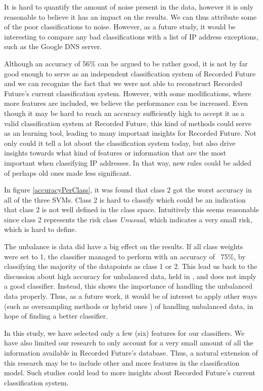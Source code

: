 It is hard to quantify the amount of noise present in the data, however it is only reasonable to believe it has an impact on the results. We can thus attribute some of the poor classifications to noise. However, as a future study, it would be interesting to compare any bad classifications with a list of IP address exceptions, such as the Google DNS server. 

Although an accuracy of 56\% can be argued to be rather good, it is not by far good enough to serve as an independent classification system of Recorded Future and we can recognize the fact that we were not able to reconstruct Recorded Future's current classification system. However, with some modifications, where more features are included, we believe the performance can be increased. Even though it may be hard to reach an accuracy sufficiently high to accept it as a valid classification system at Recorded Future, this kind of methods could serve as an learning tool, leading to many important insights for Recorded Future. Not only could it tell a lot about the classification system today, but also drive insights towards what kind of features or information that are the most important when classifying IP addresses. In that way, new rules could be added of perhaps old ones made less significant. 

In figure \ref{accuracyPerClass}, it was found that class 2 got the worst accuracy in all of the three SVMs. Class 2 is hard to classify which could be an indication that class 2 is not well defined in the class space. Intuitively this seems reasonable since class 2 represents the risk class \textit{Unusual}, which indicates a very small risk, which is hard to define.

The unbalance is data did have a big effect on the results. If all class weights were set to 1, the classifier managed to perform with an accuracy of ~75\%, by classifying the majority of the datapoints as class 1 or 2. This lead us back to the discussion about high accuracy for unbalanced data, held in , and does not imply a good classifier. Instead, this shows the importance of handling the unbalanced data properly. Thus, as a future work, it would be of interest to apply other ways (such as oversampling methods or hybrid ones \citep{wang2014}) of handling unbalanced data, in hope of finding a better classifier. 

In this study, we have selected only a few (six) features for our classifiers. We have also limited our research to only account for a very small amount of all the information available in Recorded Future's database. Thus, a natural extension of this research may be to include other and more features in the classification model. Such studies could lead to more insights about Recorded Future's current classification system.

